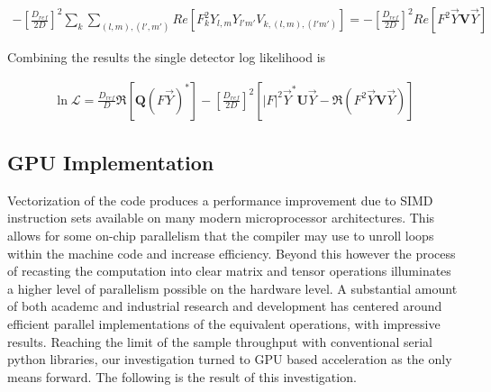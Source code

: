 \begin{align}
- \left[\frac{D_{ref}}{2D}\right]^{2}\sum_{k}\sum_{(l,m),(l',m')}Re\left[  F_{k}^{2}Y_{l,m}Y_{l'm'}V_{k,(l,m),(l'm')}\right] = - \left[\frac{D_{ref}}{2D}\right]^{2}Re \left[F^2 \vec{Y}\mathbf{V}\vec{Y} \right]
\end{align}

Combining the results the single detector log likelihood is 

\begin{align}
\ln{\mathcal{L}} = \frac{D_{ref}}{D}\Re\left[\mathbf{Q}\left(F\vec{Y}\right)^{*}\right] - \left[\frac{D_{ref}}{2D}\right]^{2}\left[|F|^2 \vec{Y}^{*}\mathbf{U}\vec{Y} - \Re\left(F^2 \vec{Y}\mathbf{V}\vec{Y}\right) \right]
\end{align}

\subsection{GPU Implementation}
Vectorization of the code produces a performance improvement due to SIMD instruction sets available on many modern microprocessor architectures. This allows for some on-chip parallelism that the compiler may use to unroll loops within the machine code and increase efficiency. Beyond this however the process of recasting the computation into clear matrix and tensor operations illuminates a higher level of parallelism possible on the hardware level. A substantial amount of both academc and industrial research and development has centered around efficient parallel implementations of the equivalent operations, with impressive results. Reaching the limit of the sample throughput with conventional serial python libraries, our investigation turned to GPU based acceleration as the only means forward. The following is the result of this investigation.

